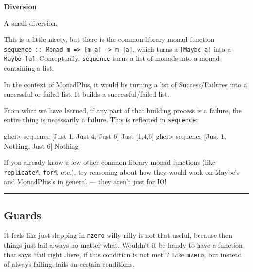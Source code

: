 \documentclass[]{article}
\newenvironment{Shaded}{}{}
\newcommand{\DataTypeTok}[1]{\textcolor[rgb]{0.56,0.13,0.00}{#1}}
\newcommand{\DecValTok}[1]{\textcolor[rgb]{0.25,0.63,0.44}{#1}}
\newcommand{\FunctionTok}[1]{\textcolor[rgb]{0.02,0.16,0.49}{#1}}
\newcommand{\NormalTok}[1]{#1}
\newcommand{\OperatorTok}[1]{\textcolor[rgb]{0.40,0.40,0.40}{#1}}
\begin{document}
\textbf{Diversion}

A small diversion.

This is a little nicety, but there is the common library monad function
\texttt{sequence\ ::\ Monad\ m\ =\textgreater{}\ {[}m\ a{]}\ -\textgreater{}\ m\ {[}a{]}},
which turns a \texttt{{[}Maybe\ a{]}} into a \texttt{Maybe\ {[}a{]}}.
Conceptually, \texttt{sequence} turns a list of monads into a monad containing a
list.

In the context of MonadPlus, it would be turning a list of Success/Failures into
a successful or failed list. It builds a successful/failed list.

From what we have learned, if any part of that building process is a failure,
the entire thing is necessarily a failure. This is reflected in
\texttt{sequence}:

\begin{Shaded}
\begin{Highlighting}[]
\NormalTok{ghci}\OperatorTok{>} \FunctionTok{sequence}\NormalTok{ [}\DataTypeTok{Just} \DecValTok{1}\NormalTok{, }\DataTypeTok{Just} \DecValTok{4}\NormalTok{, }\DataTypeTok{Just} \DecValTok{6}\NormalTok{]}
\DataTypeTok{Just}\NormalTok{ [}\DecValTok{1}\NormalTok{,}\DecValTok{4}\NormalTok{,}\DecValTok{6}\NormalTok{]}
\NormalTok{ghci}\OperatorTok{>} \FunctionTok{sequence}\NormalTok{ [}\DataTypeTok{Just} \DecValTok{1}\NormalTok{, }\DataTypeTok{Nothing}\NormalTok{, }\DataTypeTok{Just} \DecValTok{6}\NormalTok{]}
\DataTypeTok{Nothing}
\end{Highlighting}
\end{Shaded}

If you already know a few other common library monad functions (like
\texttt{replicateM}, \texttt{forM}, etc.), try reasoning about how they would
work on Maybe's and MonadPlus's in general --- they aren't just for IO!

\begin{center}\rule{0.5\linewidth}{\linethickness}\end{center}

\hypertarget{guards}{%
\subsection{Guards}\label{guards}}

It feels like just slapping in \texttt{mzero} willy-nilly is not that useful,
because then things just fail always no matter what. Wouldn't it be handy to
have a function that says ``fail right\ldots here, if this condition is not
met''? Like \texttt{mzero}, but instead of always failing, fails on certain
conditions.
\end{document}
